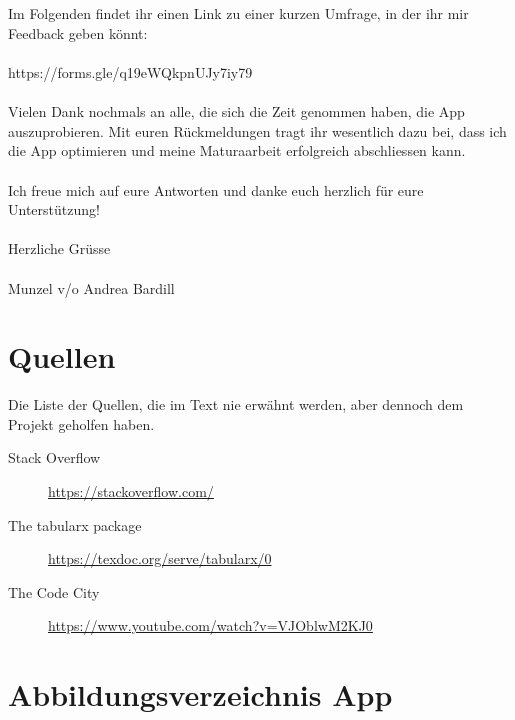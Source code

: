 \\\\
Im Folgenden findet ihr einen Link zu einer kurzen Umfrage, in der ihr mir Feedback geben könnt:
\\\\
https://forms.gle/q19eWQkpnUJy7iy79
\\\\
Vielen Dank nochmals an alle, die sich die Zeit genommen haben, die App auszuprobieren. Mit euren Rückmeldungen tragt ihr wesentlich dazu bei, dass ich die App optimieren und meine Maturaarbeit erfolgreich abschliessen kann.
\\\\
Ich freue mich auf eure Antworten und danke euch herzlich für eure Unterstützung!
\\\\
Herzliche Grüsse
\\\\
Munzel v/o Andrea Bardill

\section{Quellen}
Die Liste der Quellen, die im Text nie erwähnt werden, aber dennoch dem Projekt geholfen haben. \\
\begin{description}
    \item[Stack Overflow] \url{https://stackoverflow.com/}
    \item[The tabularx package] \url{https://texdoc.org/serve/tabularx/0}
    \item[The Code City] \url{https://www.youtube.com/watch?v=VJOblwM2KJ0}
\end{description}

\section{Abbildungsverzeichnis App}


